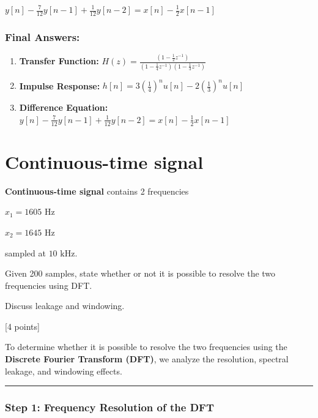 \documentclass[11pt]{article}
\begin{document}
\(y[n] - \frac{7}{12} y[n-1] + \frac{1}{12} y[n-2] = x[n] - \frac{1}{2} x[n-1]\)

\subsubsection{\texorpdfstring{\textbf{Final
Answers:}}{Final Answers:}}\label{final-answers}

\begin{enumerate}
\def\labelenumi{\arabic{enumi}.}
\item
  \textbf{Transfer Function:}
  \(\boxed{ H(z) = \frac{(1 - \frac{1}{2} z^{-1})}{(1 - \frac{1}{4} z^{-1})(1 - \frac{1}{3} z^{-1})} }\)
\item
  \textbf{Impulse Response:}
  \(\boxed{ h[n] = 3 \left(\frac{1}{4}\right)^n u[n] - 2 \left(\frac{1}{3}\right)^n u[n] }\)
\item
  \textbf{Difference Equation:}
  \(\boxed{ y[n] - \frac{7}{12} y[n-1] + \frac{1}{12} y[n-2] = x[n] - \frac{1}{2} x[n-1] }\)
\end{enumerate}

    \section{\texorpdfstring{\textbf{Continuous-time
signal}}{Continuous-time signal}}\label{continuous-time-signal}

\textbf{Continuous-time signal} contains 2 frequencies

\(x_1 = 1605 \text{ Hz}\)

\(x_2 = 1645 \text{ Hz}\)

sampled at \(10 \text{ kHz}\).

Given 200 samples, state whether or not it is possible to resolve the
two frequencies using DFT.

Discuss leakage and windowing.

{[}4 points{]}

    To determine whether it is possible to resolve the two frequencies using
the \textbf{Discrete Fourier Transform (DFT)}, we analyze the
resolution, spectral leakage, and windowing effects.

\begin{center}\rule{0.5\linewidth}{0.5pt}\end{center}

\subsubsection{\texorpdfstring{\textbf{Step 1: Frequency Resolution of
the
DFT}}{Step 1: Frequency Resolution of the DFT}}\label{step-1-frequency-resolution-of-the-dft}
\end{document}
